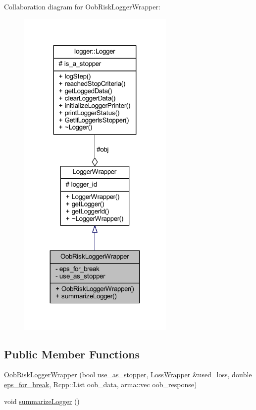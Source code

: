 Collaboration diagram for Oob\+Risk\+Logger\+Wrapper\+:\nopagebreak
\begin{figure}[H]
\begin{center}
\leavevmode
\includegraphics[width=215pt]{class_oob_risk_logger_wrapper__coll__graph}
\end{center}
\end{figure}
\subsection*{Public Member Functions}
\begin{DoxyCompactItemize}
\item 
\mbox{\hyperlink{class_oob_risk_logger_wrapper_a5d5aabfad52c12922c892a3ddf29c2d4}{Oob\+Risk\+Logger\+Wrapper}} (bool \mbox{\hyperlink{class_oob_risk_logger_wrapper_ab44c7c7c68e6710aededb230254d468a}{use\+\_\+as\+\_\+stopper}}, \mbox{\hyperlink{class_loss_wrapper}{Loss\+Wrapper}} \&used\+\_\+loss, double \mbox{\hyperlink{class_oob_risk_logger_wrapper_a7c19b01e8cb0edebad436ed8546f5016}{eps\+\_\+for\+\_\+break}}, Rcpp\+::\+List oob\+\_\+data, arma\+::vec oob\+\_\+response)
\item 
void \mbox{\hyperlink{class_oob_risk_logger_wrapper_a9fa91f33c8b15c466ee95d764ad47ecd}{summarize\+Logger}} ()
\end{DoxyCompactItemize}
